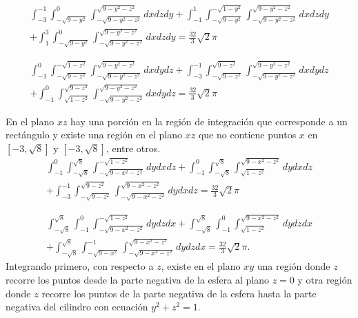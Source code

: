 \begin{multline*}
\int_{-3}^{-1}\int_{-\sqrt{9-y^2 }}^{0}\int_{-\sqrt{9-y^2 -z^2 }}^{\sqrt{9-y^2 -z^2 }}dxdzdy+\int_{-1}^{1}\int_{-\sqrt{9-y^2 }}^{-\sqrt{1-y^2 }}\int_{-\sqrt{9-y^2 -z^2 }}^{\sqrt{9-y^2 -z^2 }}dxdzdy\\
+\int_{1}^{3}\int_{-\sqrt{9-y^2 }}^{0}\int_{-\sqrt{9-y^2 -z^2 }}^{\sqrt{9-y^2 -z^2 }}dxdzdy = \frac{32}{3}\sqrt{2}\pi
\end{multline*}
%

\begin{multline*}
\int_{-1}^{0}\int_{-\sqrt{9-z^2 }}^{-\sqrt{1-z^2 }}\int_{-\sqrt{9-y^2 -z^2 }}^{\sqrt{9-y^2 -z^2 }}dxdydz+\int_{-3}^{-1}\int_{-\sqrt{9-z^2 }}^{\sqrt{9-z^2 }}\int_{-\sqrt{9-y^2 -z^2 }}^{\sqrt{9-y^2 -z^2}}dxdydz\\
+\int_{-1}^{0}\int_{\sqrt{1-z^2 }}^{\sqrt{9-z^2 }}\int_{-\sqrt{9-y^2 -z^2 }}^{\sqrt{9-y^2 -z^2 }}dxdydz= \frac{32}{3}\sqrt{2}\pi
\end{multline*}

%

En el plano $xz$ hay una porción en la región de integración que corresponde a un rectángulo y existe una región en el plano $xz$ que no contiene puntos $x$ en $[-3,\sqrt{8}]$ y $[-3,\sqrt{8}]$, entre otros.
%
\begin{multline*}
\int_{-1}^{0}\int_{-\sqrt{8}}^{\sqrt{8}}\int_{-\sqrt{9-x^{2}-z^{2}}}^{-\sqrt{1-z^{2}}}dydxdz
+\int_{-1}^{0}\int_{-\sqrt{8}}^{\sqrt{8}}\int_{\sqrt{1-z^{2}}}^{\sqrt{9-x^{2}-z^{2}}}dydxdz\\
+\int_{-3}^{-1}\int_{-\sqrt{9-z^{2}}}^{\sqrt{9-z^{2}}}\int_{-\sqrt{9-x^{2}-z^{2}}}^{\sqrt{9-x^{2}-z^{2}}}dydxdz = \frac{32}{3}\sqrt{2}\pi
\end{multline*}
%

\begin{multline*}
\int_{-\sqrt{8}}^{\sqrt{8}} \int_{-1}^{0}\int_{-\sqrt{9-x^{2}-z^{2}}}^{-\sqrt{1-z^{2}}}dydzdx
+\int_{-\sqrt{8}}^{\sqrt{8}}\int_{-1}^{0}\int_{\sqrt{1-z^{2}}}^{\sqrt{9-x^{2}-z^{2}}}dydzdx \\
+\int_{-\sqrt{8}}^{\sqrt{8}}\int_{-\sqrt{9-x^{2}}}^{-1}\int_{-\sqrt{9-x^{2}-z^{2}}}^{\sqrt{9-x^{2}-z^{2}}}dydzdx = \frac{32}{3}\sqrt{2}\pi.
\end{multline*}
%
Integrando primero, con respecto a $z$, existe en el plano $xy$ una región donde $z$ recorre los puntos desde la parte negativa de la esfera al plano
$z=0$ y otra región donde $z$ recorre los puntos de la parte negativa de la esfera hasta la parte negativa del cilindro con ecuación $y^2+z^2=1$.

